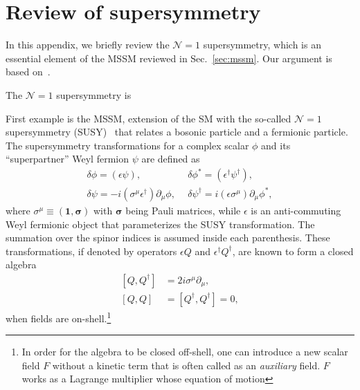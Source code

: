 \documentclass[12pt,twoside,book]{article}
\begin{document}
\section{Review of supersymmetry}

In this appendix, we briefly review the $\mathcal{N}=1$ supersymmetry,
which is an essential element of the MSSM reviewed in
Sec.~\ref{sec:mssm}.  Our argument is based on~\cite{Wess:320631,
Martin:1997ns}.

The $\mathcal{N}=1$ supersymmetry is

First example is the MSSM, extension of the SM with the so-called
$\mathcal{N}=1$ supersymmetry (SUSY)~\cite{Wess:320631, Martin:1997ns}
that relates a bosonic particle and a fermionic particle.  The
supersymmetry transformations for a complex scalar $\phi$ and its
``superpartner'' Weyl fermion $\psi$ are defined as
\begin{align}
 \delta \phi = \left( \epsilon \psi \right),
 ~&~
 \delta \phi^{*} = \left( \epsilon^\dagger \psi^\dagger \right),\\
 \delta \psi = -i \left(\sigma^\mu \epsilon^\dagger \right) \partial_\mu \phi,
 ~&~
 \delta \psi^\dagger = i \left(\epsilon \sigma^\mu \right) \partial_\mu \phi^{*},
\end{align}
where $\sigma^\mu \equiv (\bm{1}, \bm{\sigma})$ with $\bm{\sigma}$
being Pauli matrices, while $\epsilon$ is an anti-commuting Weyl
fermionic object that parameterizes the SUSY transformation.  The
summation over the spinor indices is assumed inside each parenthesis.
These transformations, if denoted by operators $\epsilon Q$ and
$\epsilon^\dagger Q^\dagger$, are known to form a closed algebra
\begin{align}
 \left[ Q, Q^\dagger \right] &= 2 i \sigma^\mu \partial_\mu,\\
 \left[ Q, Q \right] &= \left[ Q^\dagger, Q^\dagger \right] = 0,
\end{align}
when fields are on-shell.\footnote{
In order for the algebra to be closed off-shell, one can introduce a
new scalar field $F$ without a kinetic term that is often called as an
\textit{auxiliary} field.  $F$ works as a Lagrange multiplier whose
equation of motion }
\end{document}
